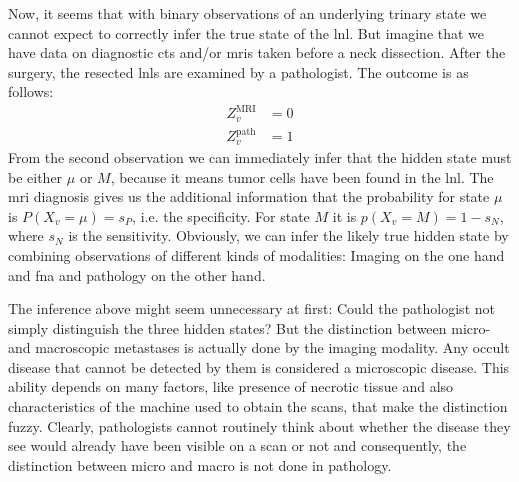 \documentclass[\relativeRoot/main.tex]{subfiles}
\begin{document}
Now, it seems that with binary observations of an underlying trinary state we cannot expect to correctly infer the true state of the \gls{lnl}. But imagine that we have data on diagnostic \glspl{ct} and/or \glspl{mri} taken before a neck dissection. After the surgery, the resected \glspl{lnl} are examined by a pathologist. The outcome is as follows:
%
\begin{equation}
    \begin{aligned}
        Z_v^\text{MRI} &= 0 \\
        Z_v^\text{path} &= 1
    \end{aligned}
\end{equation}
%
From the second observation we can immediately infer that the hidden state must be either $\mu$ or $M$, because it means tumor cells have been found in the \gls{lnl}. The \gls{mri} diagnosis gives us the additional information that the probability for state $\mu$ is $P(X_v = \mu) = s_P$, i.e. the specificity. For state $M$ it is $p(X_v = M) = 1 - s_N$, where $s_N$ is the sensitivity. Obviously, we can infer the likely true hidden state by combining observations of different kinds of modalities: Imaging on the one hand and \gls{fna} and pathology on the other hand.

The inference above might seem unnecessary at first: Could the pathologist not simply distinguish the three hidden states? But the distinction between micro- and macroscopic metastases is actually done by the imaging modality. Any occult disease that cannot be detected by them is considered a microscopic disease. This ability depends on many factors, like presence of necrotic tissue and also characteristics of the machine used to obtain the scans, that make the distinction fuzzy. Clearly, pathologists cannot routinely think about whether the disease they see would already have been visible on a scan or not and consequently, the distinction between micro and macro is not done in pathology.
\end{document}
